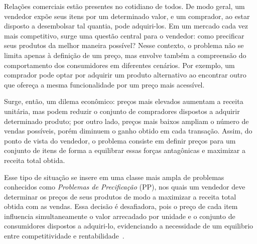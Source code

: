 




Relações comerciais estão presentes no cotidiano de todos. De modo geral, um vendedor expõe seus itens por um determinado valor, e um comprador, ao estar disposto a desembolsar tal quantia, pode adquiri-los. Em um mercado cada vez mais competitivo, surge uma questão central para o vendedor: como precificar seus produtos da melhor maneira possível? Nesse contexto, o problema não se limita apenas à definição de um preço, mas envolve também a compreensão do comportamento dos consumidores em diferentes cenários. Por exemplo, um comprador pode optar por adquirir um produto alternativo ao encontrar outro que ofereça a mesma funcionalidade por um preço mais acessível.

Surge, então, um dilema econômico: preços mais elevados aumentam a receita unitária, mas podem reduzir o conjunto de compradores dispostos a adquirir determinado produto; por outro lado, preços mais baixos ampliam o número de vendas possíveis, porém diminuem o ganho obtido em cada transação. Assim, do ponto de vista do vendedor, o problema consiste em definir preços para um conjunto de itens de forma a equilibrar essas forças antagônicas e maximizar a receita total obtida.

Esse tipo de situação se insere em uma classe mais ampla de problemas conhecidos como \textit{Problemas de Precificação} (PP), nos quais um vendedor deve determinar os preços de seus produtos de modo a maximizar a receita total obtida com as vendas. Essa decisão é desafiadora, pois o preço de cada item influencia simultaneamente o valor arrecadado por unidade e o conjunto de consumidores dispostos a adquiri-lo, evidenciando a necessidade de um equilibrio entre competitividade e rentabilidade~\cite{smith1986}.

